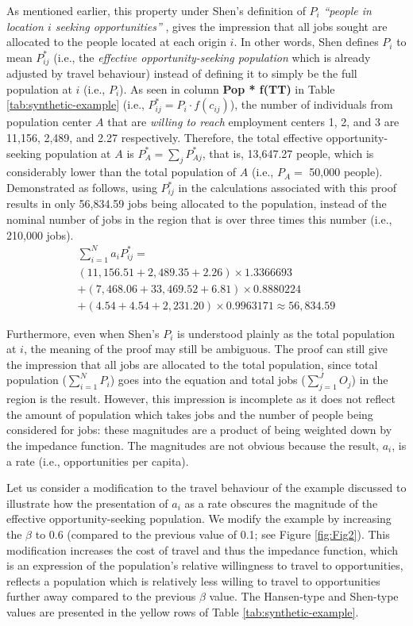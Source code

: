 \documentclass[10pt,letterpaper]{article}
\begin{document}
As mentioned earlier, this property under Shen's definition of \(P_i\)
\emph{``people in location \(i\) seeking opportunities''} , gives the
impression that all jobs sought are allocated to the people located at
each origin \(i\). In other words, Shen defines \(P_i\) to mean
\(P_{ij}^*\) (i.e., the \emph{effective opportunity-seeking population}
which is already adjusted by travel behaviour) instead of defining it to
simply be the full population at \(i\) (i.e., \(P_i\)). As seen in
column \textbf{Pop * f(TT)} in Table \ref{tab:synthetic-example} (i.e.,
\(P_{ij}^* = P_i\cdot f(c_{ij})\)), the number of individuals from
population center \(A\) that are \emph{willing to reach} employment
centers 1, 2, and 3 are 11,156, 2,489, and 2.27 respectively. Therefore,
the total effective opportunity-seeking population at \(A\) is
\(P_A^* = \sum_jP_{Aj}^*\), that is, 13,647.27 people, which is
considerably lower than the total population of \(A\) (i.e., \(P_A=\)
50,000 people). Demonstrated as follows, using \(P_{ij}^*\) in the
calculations associated with this proof results in only 56,834.59 jobs
being allocated to the population, instead of the nominal number of jobs
in the region that is over three times this number (i.e., 210,000 jobs).
\[
\begin{array}{l}
\sum_{i=1}^N a_{i} P_{ij}^* =\\
(11,156.51 + 2,489.35 + 2.26)\times 1.3366693 \\
+ (7,468.06 + 33,469.52 + 6.81)\times 0.8880224\\
+ (4.54 + 4.54 + 2,231.20)\times 0.9963171 \approx 56,834.59
\end{array}
\]

Furthermore, even when Shen's \(P_i\) is understood plainly as the total
population at \(i\), the meaning of the proof may still be ambiguous.
The proof can still give the impression that all jobs are allocated to
the total population, since total population (\(\sum_{i=1}^N P_i\)) goes
into the equation and total jobs (\(\sum_{j=1}^JO_j\)) in the region is
the result. However, this impression is incomplete as it does not
reflect the amount of population which takes jobs and the number of
people being considered for jobs: these magnitudes are a product of
being weighted down by the impedance function. The magnitudes are not
obvious because the result, \(a_i\), is a rate (i.e., opportunities per
capita).

Let us consider a modification to the travel behaviour of the example
discussed to illustrate how the presentation of \(a_i\) as a rate
obscures the magnitude of the effective opportunity-seeking population.
We modify the example by increasing the \(\beta\) to 0.6 (compared to
the previous value of 0.1; see Figure \ref{fig:Fig2}). This modification
increases the cost of travel and thus the impedance function, which is
an expression of the population's relative willingness to travel to
opportunities, reflects a population which is relatively less willing to
travel to opportunities further away compared to the previous \(\beta\)
value. The Hansen-type and Shen-type values are presented in the yellow
rows of Table \ref{tab:synthetic-example}.
\end{document}
